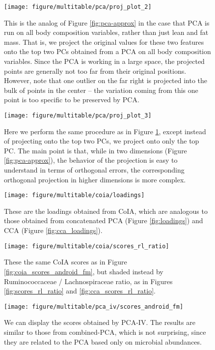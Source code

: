 \begin{figure}
  \texttt{[image: figure/multitable/pca/proj\_plot\_2]}
  \caption{This is the analog of Figure \ref{fig:pca-approx} in the case that
    PCA is run on all body composition variables, rather than just lean and
    fat mass. That is, we project the original values for these two features
    onto the top two PCs obtained from a PCA on all body composition variables.
    Since the PCA is working in a large space, the projected points are
    generally not too far from their original positions. However, note that one
    outlier on the far right is projected into the bulk of points in the center
    -- the variation coming from this one point is too specific to be preserved
    by PCA.
  \label{fig:pca-approx-2}}
\end{figure}

\begin{figure}
  \texttt{[image: figure/multitable/pca/proj\_plot\_3]}
  \caption{Here we perform the same procedure as in Figure
    \ref{fig:pca-approx-2}, except instead of projecting onto the top two PCs,
    we project onto only the top PC. The main point is that, while in two
    dimensions (Figure \ref{fig:pca-approx}), the behavior of the projection is
    easy to understand in terms of orthogonal errors, the corresponding
    orthogonal projection in higher dimensions is more complex.
  \label{fig:pca-approx-3}}
\end{figure}

\begin{figure}
  \centering \texttt{[image: figure/multitable/coia/loadings]}
  \caption{These are the loadings obtained from CoIA, which are analogous to
    those obtained from concatenated PCA (Figure \ref{fig:loadings}) and CCA
    (Figure \ref{fig:cca_loadings}). \label{fig:coia_loadings} }
\end{figure}

\begin{figure}
  \centering
  \texttt{[image: figure/multitable/coia/scores\_rl\_ratio]}
  \caption{These the same CoIA scores as in Figure \ref{fig:coia_scores_android_fm},
    but shaded instead by Ruminococcaceae / Lachnospiraceae ratio, as in Figures
    \ref{fig:scores_rl_ratio} and
    \ref{fig:cca_scores_rl_ratio}. \label{fig:coia_scores_rl_ratio} }
\end{figure}

\begin{figure}
  \centering
  \texttt{[image: figure/multitable/pca\_iv/scores\_android\_fm]}
  \caption{We can display the scores obtained by PCA-IV. The results are similar
    to those from combined-PCA, which is not surprising, since they are related
    to the PCA based only on microbial
    abundances. \label{fig:pca_iv_scores_android_fm} }
\end{figure}

